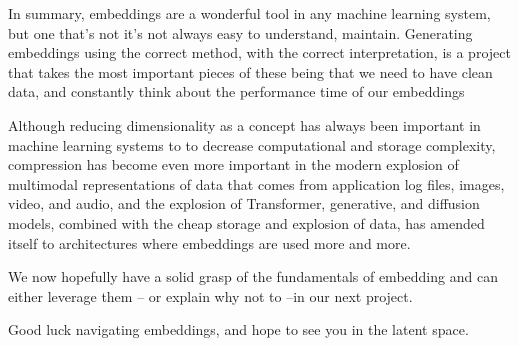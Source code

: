 \documentclass[11pt, table]{diazessay} %
\begin{document}
\begin{sloppypar}
In summary, embeddings are a wonderful tool in any machine learning system, but one that's not it's not always easy to understand, maintain. Generating embeddings using the correct method, with the correct interpretation, is a project that takes  the most important pieces of these being that we need to have clean data, and constantly think about the performance time of our embeddings

Although reducing dimensionality as a concept has always been important in machine learning systems to to decrease computational and storage complexity, compression has become even more important in the modern explosion of multimodal representations of data that comes from application log files, images, video, and audio, and the explosion of Transformer, generative, and diffusion models, combined with the cheap storage and explosion of data, has amended itself to architectures where embeddings are used more and more.

We now hopefully have a solid grasp of the fundamentals of embedding and can either leverage them -- or explain why not to --in our next project.
 
Good luck navigating embeddings, and hope to see you in the latent space.


\newpage


\newpage



\end{sloppypar}
\end{document}
